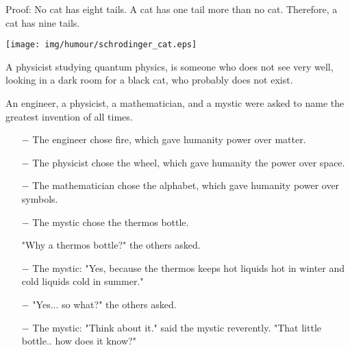 	Proof: No cat has eight tails. A cat has one tail more than no cat. Therefore, a cat has nine tails.
	
	\begin{center}\underline{\hspace{5 cm}}\end{center}

	\begin{center}
	\texttt{[image: img/humour/schrodinger\_cat.eps]}
	\end{center}
	
	\begin{center}\underline{\hspace{5 cm}}\end{center}

	A physicist studying quantum physics, is someone who does not see very well, looking in a dark room for a black cat, who probably does not exist.
	
	\begin{center}\underline{\hspace{5 cm}}\end{center}

	An engineer, a physicist, a mathematician, and a mystic were asked to name the greatest invention of all times. 

\begin{itemize}	 
	\item[$-$] The engineer chose fire, which gave humanity power over matter.

	\item[$-$] The physicist chose the wheel, which gave humanity the power over space.

	\item[$-$] The mathematician chose the alphabet, which gave humanity power over symbols.

	\item[$-$] The mystic chose the thermos bottle.

"Why a thermos bottle?" the others asked.

	\item[$-$] The mystic: "Yes, because the thermos keeps hot liquids hot in winter and cold liquids cold in summer."

	\item[$-$] "Yes... so what?" the others asked.

	\item[$-$] The mystic: "Think about it." said the mystic reverently. "That little bottle.. how does it know?"
	\end{itemize}
\begin{center}\underline{\hspace{5 cm}}\end{center}

